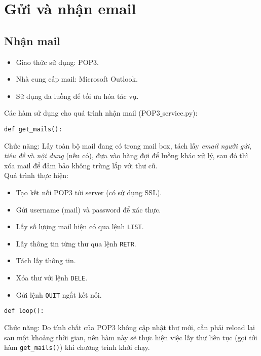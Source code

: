 \section{Gửi và nhận email}
\subsection{Nhận mail}
\begin{itemize}
\item Giao thức sử dụng: POP3.
\item Nhà cung cấp mail: Microsoft Outlook.
\item Sử dụng đa luồng để tối ưu hóa tác vụ.
\end{itemize}
Các hàm sử dụng cho quá trình nhận mail (POP3$\_$service.py):
\begin{lstlisting}
def get_mails():
\end{lstlisting}
Chức năng: Lấy toàn bộ mail đang có trong mail box, tách lấy \textit{email người gửi}, \textit{tiêu đề} và \textit{nội dung} (nếu có), đưa vào hàng đợi để luồng khác xử lý, sau đó thì xóa mail để đảm bảo không trùng lắp với thư cũ.\\
Quá trình thực hiện:
\begin{itemize}
 \item Tạo kết nối POP3 tới server (có sử dụng SSL).
 \item Gửi username (mail) và password để xác thực.
 \item Lấy số lượng mail hiện có qua lệnh \lstinline{LIST}.
 \item Lấy thông tin từng thư qua lệnh \lstinline{RETR}.
 \item Tách lấy thông tin.
 \item Xóa thư với lệnh \lstinline{DELE}.
 \item Gửi lệnh \lstinline{QUIT} ngắt kết nối.
\end{itemize} 

\begin{lstlisting}
def loop():
\end{lstlisting}
Chức năng: Do tính chất của POP3 không cập nhật thư mới, cần phải reload lại sau một khoảng thời gian, nên hàm này sẽ thực hiện việc lấy thư liên tục (gọi tới hàm \lstinline{get_mails()}) khi chương trình khởi chạy.

